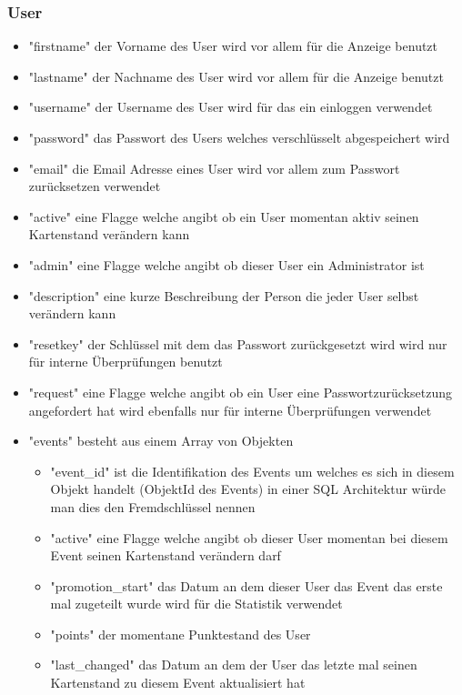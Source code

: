 			\subsubsection{User}
				\begin{itemize}
					\item "firstname" der Vorname des User wird vor allem für die Anzeige benutzt
					\item "lastname" der Nachname des User wird vor allem für die Anzeige benutzt
					\item "username" der Username des User wird für das ein einloggen verwendet
					\item "password" das Passwort des Users welches verschlüsselt abgespeichert wird
					\item "email" die Email Adresse eines User wird vor allem zum Passwort zurücksetzen verwendet
					\item "active" eine Flagge welche angibt ob ein User momentan aktiv seinen Kartenstand verändern kann
					\item "admin" eine Flagge welche angibt ob dieser User ein Administrator ist
					\item "description" eine kurze Beschreibung der Person die jeder User selbst verändern kann
					\item "resetkey" der Schlüssel mit dem das Passwort zurückgesetzt wird wird nur für interne Überprüfungen benutzt
					\item "request" eine Flagge welche angibt ob ein User eine Passwortzurücksetzung angefordert hat wird ebenfalls nur für interne Überprüfungen verwendet
					\item "events" besteht aus einem Array von Objekten
					\begin{itemize}
						\item "event\_id" ist die Identifikation des Events um welches es sich in diesem Objekt handelt (ObjektId des Events) in einer SQL Architektur würde man dies den Fremdschlüssel nennen
						\item "active" eine Flagge welche angibt ob dieser User momentan bei diesem Event seinen Kartenstand verändern darf
						\item "promotion\_start" das Datum an dem dieser User das Event das erste mal zugeteilt wurde wird für die Statistik verwendet
						\item "points" der momentane Punktestand des User
						\item "last\_changed" das Datum an dem der User das letzte mal seinen Kartenstand zu diesem Event aktualisiert hat

\end{itemize}
\end{itemize}
